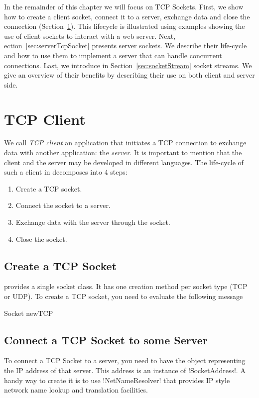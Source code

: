 \documentclass[a4paper,10pt,twoside]{book}
\begin{document}
In the remainder of this chapter we will focus on TCP Sockets.
First, we show how to create a client socket, connect it to a server, exchange data and close the connection (Section~\ref{sec:clientTcpSocket}).
This lifecycle is illustrated using examples showing the use of client sockets to interact with a web server. 
Next, ection~\ref{sec:serverTcpSocket} presents server sockets.
We describe their life-cycle and how to use them to implement a server that can handle concurrent connections.
Last, we introduce in Section~\ref{sec:socketStream} socket streams.
We give an overview of their benefits by describing their use on both client and server side.
 
\section{TCP Client}
\label{sec:clientTcpSocket}
We call \textit{TCP client}  an application that initiates a TCP connection to exchange data with another application: the \textit{server}.
It is important to mention that the client and the server may be developed in different languages.
The life-cycle of such a client in \pharo decomposes into 4 steps:
\begin{enumerate}
\item Create a TCP socket.
\item Connect the socket to a server.
\item Exchange data with the server through the socket.
\item Close the socket.
\end{enumerate}

\subsection{Create a TCP Socket}
\pharo provides a single socket class.
It has one creation method per socket type (TCP or UDP).
To create a TCP socket, you need to evaluate the following message 
\begin{code}{}
Socket newTCP
\end{code}

\subsection{Connect a TCP Socket to some Server}
To connect a TCP Socket to a server, you need to have the object representing the IP address of that server. This address is an instance of \ct!SocketAddress!.
A handy way to create it is to use \ct!NetNameResolver! that  provides IP style network name lookup and translation facilities.
\end{document}
